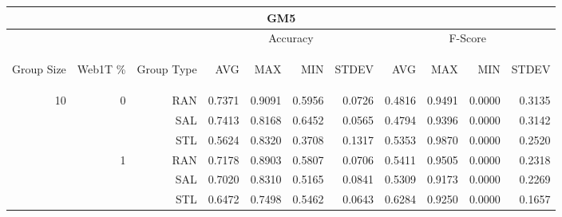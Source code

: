 \begin{center}
\begin{table}[htbp] 
 \begin{center}
\begin{tabular}{ | r | r | r | r | r | r | r | r | r | r | r |}
\hline
\multicolumn{11}{|c|}{GM5}\\
\hline
 & & & \multicolumn{4}{|c|}{Accuracy} & \multicolumn{4}{|c|}{F-Score}\\ \cline{4-11}
\begin{sideways}Group Size\end{sideways} & \begin{sideways}Web1T \%\end{sideways} & \begin{sideways}Group Type\end{sideways} & \begin{sideways}AVG\end{sideways} & \begin{sideways}MAX\end{sideways} & \begin{sideways}MIN\end{sideways} & \begin{sideways}STDEV\end{sideways} & \begin{sideways}AVG\end{sideways} & \begin{sideways}MAX\end{sideways} & \begin{sideways}MIN\end{sideways} & \begin{sideways}STDEV\end{sideways}\\
\hline
\multirow{18}{*}{10}
 & \multirow{3}{*}{0} & RAN & 0.7371 & 0.9091 & 0.5956 & 0.0726 & 0.4816 & 0.9491 & 0.0000 & 0.3135\\ \cline{3-11}
 &   & SAL & 0.7413 & 0.8168 & 0.6452 & 0.0565 & 0.4794 & 0.9396 & 0.0000 & 0.3142\\ \cline{3-11}
 &   & STL & 0.5624 & 0.8320 & 0.3708 & 0.1317 & 0.5353 & 0.9870 & 0.0000 & 0.2520\\ \cline{2-11}
 & \multirow{3}{*}{1} & RAN & 0.7178 & 0.8903 & 0.5807 & 0.0706 & 0.5411 & 0.9505 & 0.0000 & 0.2318\\ \cline{3-11}
 &   & SAL & 0.7020 & 0.8310 & 0.5165 & 0.0841 & 0.5309 & 0.9173 & 0.0000 & 0.2269\\ \cline{3-11}
 &   & STL & 0.6472 & 0.7498 & 0.5462 & 0.0643 & 0.6284 & 0.9250 & 0.0000 & 0.1657\\ \cline{2-11}

\end{tabular}
\end{center}
\end{table}
\end{center}
